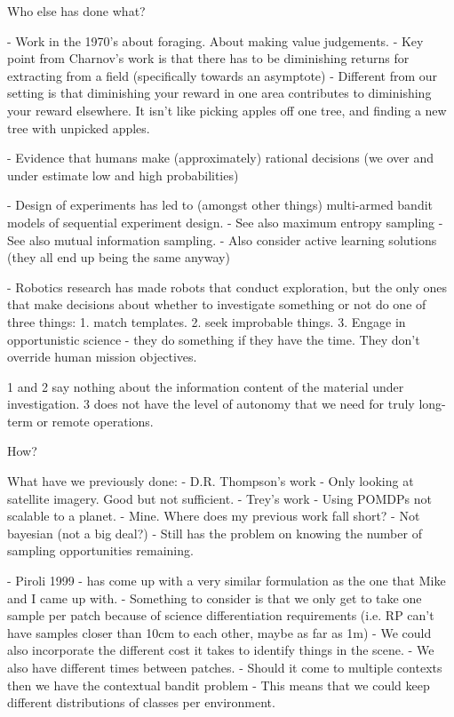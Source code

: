 \documentclass[preprint,12pt,3p]{elsarticle}
\begin{document}
	Who else has done what?

	- Work in the 1970's about foraging.  About making value judgements.
		- Key point from Charnov's work is that there has to be diminishing returns
		for extracting from a field (specifically towards an asymptote)
		- Different from our setting is that diminishing your reward in one area 
		contributes to diminishing your reward elsewhere. It isn't like picking
		apples off one tree, and finding a new tree with unpicked apples.

- Evidence that humans make (approximately) rational decisions (we over and under estimate low and high probabilities)

	- Design of experiments has led to (amongst other things) multi-armed bandit models of sequential experiment design.
	- See also maximum entropy sampling
	- See also mutual information sampling.
- Also consider active learning solutions (they all end up being the same anyway)

	- Robotics research has made robots that conduct exploration, but the only ones that make decisions about whether to investigate something or not do one of three things:
	1. match templates.
	2. seek improbable things.
	3. Engage in opportunistic science - they do something if they have the time.  They don't override human mission objectives.

	1 and 2 say nothing about the information content of the material under investigation.
	3 does not have the level of autonomy that we need for truly long-term or remote operations.

	How?

	What have we previously done:
	- D.R. Thompson's work
	- Only looking at satellite imagery.  Good but not sufficient.
	- Trey's work
	- Using POMDPs not scalable to a planet.
	- Mine. Where does my previous work fall short?
- Not bayesian (not a big deal?)
	- Still has the problem on knowing the number of sampling opportunities remaining.

	- Piroli 1999 - has come up with a very similar formulation as the one that 
		Mike and I came up with.
		- Something to consider is that we only get to take one sample per patch 
			because of science differentiation requirements (i.e. RP can't have 
			samples closer than 10cm to each other, maybe as far as 1m)
		- We could also incorporate the different cost it takes to identify things 
			in the scene.
		- We also have different times between patches.
		- Should it come to multiple contexts then we have the contextual bandit 
			problem
				- This means that we could keep different distributions of classes per 
					environment.
\end{document}
